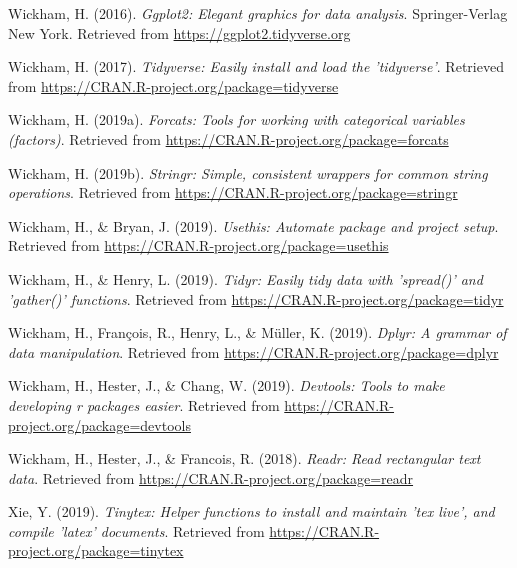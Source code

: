 \documentclass[man]{apa6}
\begin{document}
\hypertarget{ref-R-ggplot2}{}
Wickham, H. (2016). \emph{Ggplot2: Elegant graphics for data analysis}.
Springer-Verlag New York. Retrieved from
\url{https://ggplot2.tidyverse.org}

\hypertarget{ref-R-tidyverse}{}
Wickham, H. (2017). \emph{Tidyverse: Easily install and load the
'tidyverse'}. Retrieved from
\url{https://CRAN.R-project.org/package=tidyverse}

\hypertarget{ref-R-forcats}{}
Wickham, H. (2019a). \emph{Forcats: Tools for working with categorical
variables (factors)}. Retrieved from
\url{https://CRAN.R-project.org/package=forcats}

\hypertarget{ref-R-stringr}{}
Wickham, H. (2019b). \emph{Stringr: Simple, consistent wrappers for
common string operations}. Retrieved from
\url{https://CRAN.R-project.org/package=stringr}

\hypertarget{ref-R-usethis}{}
Wickham, H., \& Bryan, J. (2019). \emph{Usethis: Automate package and
project setup}. Retrieved from
\url{https://CRAN.R-project.org/package=usethis}

\hypertarget{ref-R-tidyr}{}
Wickham, H., \& Henry, L. (2019). \emph{Tidyr: Easily tidy data with
'spread()' and 'gather()' functions}. Retrieved from
\url{https://CRAN.R-project.org/package=tidyr}

\hypertarget{ref-R-dplyr}{}
Wickham, H., François, R., Henry, L., \& Müller, K. (2019). \emph{Dplyr:
A grammar of data manipulation}. Retrieved from
\url{https://CRAN.R-project.org/package=dplyr}

\hypertarget{ref-R-devtools}{}
Wickham, H., Hester, J., \& Chang, W. (2019). \emph{Devtools: Tools to
make developing r packages easier}. Retrieved from
\url{https://CRAN.R-project.org/package=devtools}

\hypertarget{ref-R-readr}{}
Wickham, H., Hester, J., \& Francois, R. (2018). \emph{Readr: Read
rectangular text data}. Retrieved from
\url{https://CRAN.R-project.org/package=readr}

\hypertarget{ref-R-tinytex}{}
Xie, Y. (2019). \emph{Tinytex: Helper functions to install and maintain
'tex live', and compile 'latex' documents}. Retrieved from
\url{https://CRAN.R-project.org/package=tinytex}

\endgroup
\end{document}
